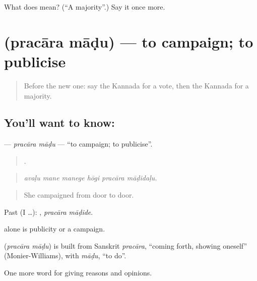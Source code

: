 \begin{tcolorbox}[breakable,colback=teal!4,colframe=teal!35!black,title={Before you move on}]
What does  mean? (\textquotedblleft{}A majority\textquotedblright{}.) Say it once more.
\end{tcolorbox}
\section[\texorpdfstring{\kn{ಪ್ರಚಾರ} \kn{ಮಾಡು} (pracāra māḍu)}{ಪ್ರಚಾರ ಮಾಡು (pracāra māḍu)}]{  (pracāra māḍu) — to campaign; to publicise}

\label{lesson:KA-C392-pracara-madu}



\begin{quote}
Before the new one: say the Kannada for a vote, then the Kannada for a majority.
\end{quote}

\subsection*{You'll want to know:  }
\textbf{ } — \emph{pracāra māḍu} — \textquotedblleft{}to campaign; to publicise\textquotedblright{}.

\begin{quote}
     .
\end{quote}

\begin{quote}
\emph{avaḷu mane manege hōgi pracāra māḍidaḷu.}
\end{quote}

\begin{quote}
She campaigned from door to door.
\end{quote}

Past (I …):  , \emph{pracāra māḍide}.

 alone is publicity or a campaign.

\begin{cousinweb}
\textbf{ } (\emph{pracāra māḍu}) is built from Sanskrit \emph{pracāra}, \textquotedblleft{}coming forth, showing oneself\textquotedblright{} (Monier-Williams), with \emph{māḍu}, \textquotedblleft{}to do\textquotedblright{}.
\end{cousinweb}

\begin{grammarlens}[title={What you've built}]
One more word for giving reasons and opinions.
\end{grammarlens}

